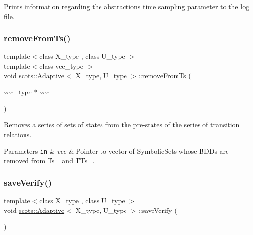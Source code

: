 Prints information regarding the abstractions\textquotesingle{} time sampling parameter to the log file. \mbox{\label{classscots_1_1Adaptive_a47e3334958032965fa6218ad0c24ac02}} 
\subsubsection{\texorpdfstring{remove\+From\+Ts()}{removeFromTs()}}
{\footnotesize\ttfamily template$<$class X\+\_\+type , class U\+\_\+type $>$ \\
template$<$class vec\+\_\+type $>$ \\
void \hyperlink{classscots_1_1Adaptive}{scots\+::\+Adaptive}$<$ X\+\_\+type, U\+\_\+type $>$\+::remove\+From\+Ts (\begin{DoxyParamCaption}\item[{vec\+\_\+type $\ast$}]{vec }\end{DoxyParamCaption})\hspace{0.3cm}{\ttfamily [inline]}}

Removes a series of sets of states from the pre-\/states of the series of transition relations. 
\begin{DoxyParams}[1]{Parameters}
\mbox{\tt in}  & {\em vec} & Pointer to vector of Symbolic\+Sets whose B\+D\+Ds are removed from Ts\+\_\+ and T\+Ts\+\_\+. \\
\hline
\end{DoxyParams}
\mbox{\label{classscots_1_1Adaptive_ab1d6eeb4c4b6ec88e7e6a283a7dfd57d}} 
\subsubsection{\texorpdfstring{save\+Verify()}{saveVerify()}}
{\footnotesize\ttfamily template$<$class X\+\_\+type , class U\+\_\+type $>$ \\
void \hyperlink{classscots_1_1Adaptive}{scots\+::\+Adaptive}$<$ X\+\_\+type, U\+\_\+type $>$\+::save\+Verify (\begin{DoxyParamCaption}{ }\end{DoxyParamCaption})\hspace{0.3cm}{\ttfamily [inline]}}

